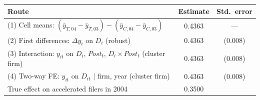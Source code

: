 \begin{tabular}{lcc}\toprule
Route & Estimate & Std.\ error \\ \midrule
(1) Cell means: $(\bar y_{T,04}-\bar y_{T,03})-(\bar y_{C,04}-\bar y_{C,03})$ & 0.4363 & --- \\
(2) First differences: $\Delta y_i$ on $D_i$ (robust) & 0.4363 & (0.008) \\
(3) Interaction: $y_{it}$ on $D_i$, $Post_t$, $D_i \times Post_t$ (cluster firm) & 0.4363 & (0.008) \\
(4) Two-way FE: $y_{it}$ on $D_{it}$ $\mid$ firm, year (cluster firm) & 0.4363 & (0.008) \\
\midrule
True effect on accelerated filers in 2004 & 0.3500 &  \\
\bottomrule\end{tabular}
